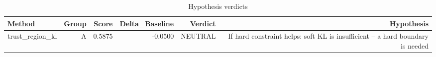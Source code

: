 \begin{table}[htbp]
\centering
\caption{Hypothesis verdicts}
\label{tab:hyp-verdicts}
\begin{tabular}{lrrrrr}
\toprule
\textbf{Method} & \textbf{Group} & \textbf{Score} & \textbf{Delta\_Baseline} & \textbf{Verdict} & \textbf{Hypothesis} \\
\midrule
trust\_region\_kl & A & 0.5875 & -0.0500 & NEUTRAL & If hard constraint helps: soft KL is insufficient -- a hard boundary is needed \\
\bottomrule
\end{tabular}
\end{table}